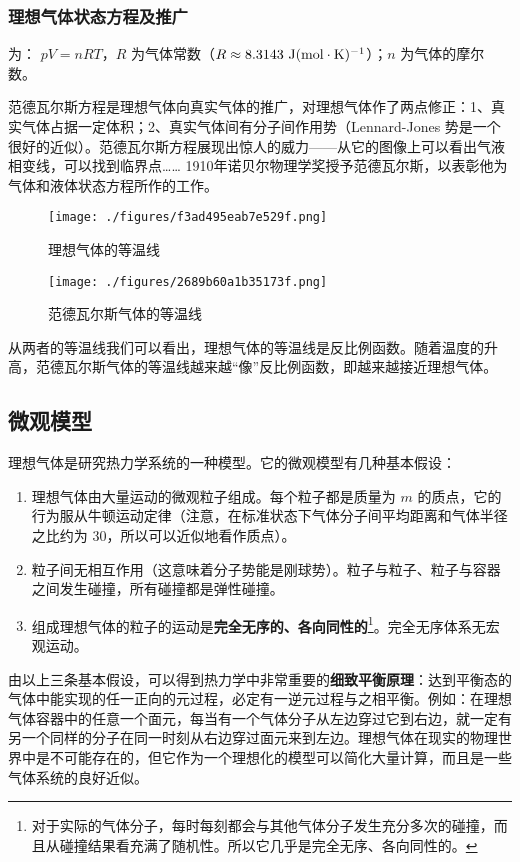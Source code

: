 \subsubsection{理想气体状态方程及推广}
为： $pV=nRT$，$R$ 为气体常数（$R\approx 8.3143\ \rm{J}(\rm{mol\cdot K})^{-1}$）；$n$ 为气体的摩尔数。

范德瓦尔斯方程是理想气体向真实气体的推广，对理想气体作了两点修正：1、真实气体占据一定体积；2、真实气体间有分子间作用势（Lennard-Jones 势是一个很好的近似）。范德瓦尔斯方程展现出惊人的威力——从它的图像上可以看出气液相变线，可以找到临界点…… 1910年诺贝尔物理学奖授予范德瓦尔斯，以表彰他为气体和液体状态方程所作的工作。
\begin{figure}[ht]
\centering
\texttt{[image: ./figures/f3ad495eab7e529f.png]}
\caption{理想气体的等温线} \label{fig_Igas_1}
\end{figure}
\begin{figure}[ht]
\centering
\texttt{[image: ./figures/2689b60a1b35173f.png]}
\caption{范德瓦尔斯气体的等温线} \label{fig_Igas_2}
\end{figure}

从两者的等温线我们可以看出，理想气体的等温线是反比例函数。随着温度的升高，范德瓦尔斯气体的等温线越来越“像”反比例函数，即越来越接近理想气体。
\subsection{微观模型}

理想气体是研究热力学系统的一种模型。它的微观模型有几种基本假设：
\begin{enumerate}
\item 理想气体由大量运动的微观粒子组成。每个粒子都是质量为 $m$ 的质点，它的行为服从牛顿运动定律（注意，在标准状态下气体分子间平均距离和气体半径之比约为 $30$，所以可以近似地看作质点）。

\item 粒子间无相互作用（这意味着分子势能是刚球势）。粒子与粒子、粒子与容器之间发生碰撞，所有碰撞都是弹性碰撞。

\item 组成理想气体的粒子的运动是\textbf{完全无序的、各向同性的}\footnote{对于实际的气体分子，每时每刻都会与其他气体分子发生充分多次的碰撞，而且从碰撞结果看充满了随机性。所以它几乎是完全无序、各向同性的。}。完全无序体系无宏观运动。
\end{enumerate}

由以上三条基本假设，可以得到热力学中非常重要的\textbf{细致平衡原理}：达到平衡态的气体中能实现的任一正向的元过程，必定有一逆元过程与之相平衡。例如：在理想气体容器中的任意一个面元，每当有一个气体分子从左边穿过它到右边，就一定有另一个同样的分子在同一时刻从右边穿过面元来到左边。理想气体在现实的物理世界中是不可能存在的，但它作为一个理想化的模型可以简化大量计算，而且是一些气体系统的良好近似。

